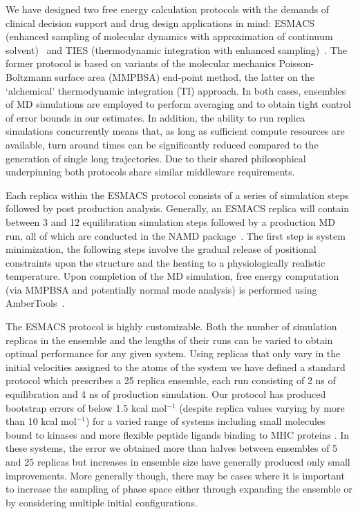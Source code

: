 We have designed two free energy calculation protocols with the demands of clinical
decision support and drug design applications in mind: ESMACS (enhanced
sampling of molecular dynamics with approximation of continuum
solvent)~\cite{Wan2017brd4} and TIES (thermodynamic integration with enhanced
sampling)~\cite{Bhati2017}. 
The former protocol is based on variants of the molecular mechanics Poisson-Boltzmann 
surface area (MMPBSA) end-point method, the latter on the `alchemical' thermodynamic 
integration (TI) approach. 
In both cases, ensembles of MD simulations are employed to perform averaging and
to obtain tight control of error bounds in our estimates. 
In addition, the ability to run replica simulations concurrently means that, as long as
sufficient compute resources are available, turn around times can be significantly 
reduced compared to the generation of single long trajectories.
Due to their shared philosophical underpinning both protocols share similar middleware 
requirements.



Each replica within the ESMACS protocol consists of a series of simulation
steps followed by post production analysis. 
Generally, an ESMACS replica will contain between 3 and 12 equilibration 
simulation steps followed by a production MD run, all of which are conducted in 
the NAMD package~\cite{Phillips2005}. 
The first step is system minimization, the following steps involve the gradual release 
of positional constraints upon the structure and the heating to a physiologically realistic 
temperature. 
Upon completion of the MD simulation, free energy computation (via MMPBSA and potentially 
normal mode analysis) is performed using AmberTools~\cite{amber14, Case2005, MillerIII2012}.

The ESMACS protocol is highly customizable. Both the number of simulation 
replicas in the ensemble and the lengths of their runs can be varied to
obtain optimal performance for any given system. Using replicas that only
vary in the initial velocities assigned to the atoms of the system we have
defined a standard protocol which prescribes a 25 replica ensemble, each run
consisting of 2 ns of equilibration and 4 ns of production simulation. Our
protocol has produced bootstrap errors of below 1.5 kcal mol$^{-1}$ (despite
replica values varying by more than 10 kcal mol$^{-1}$) for a varied range of
systems including small molecules bound to kinases and more flexible peptide
ligands binding to MHC proteins \cite{Wan2015, Wright2014, Wan2017brd4}.
In these systems, the error we obtained more than halves between ensembles of
5 and 25 replicas but increases in ensemble size have generally produced only
small improvements. More generally though, there may be cases where it is
important to increase the sampling of phase space either through expanding
the ensemble or by considering multiple initial configurations.

